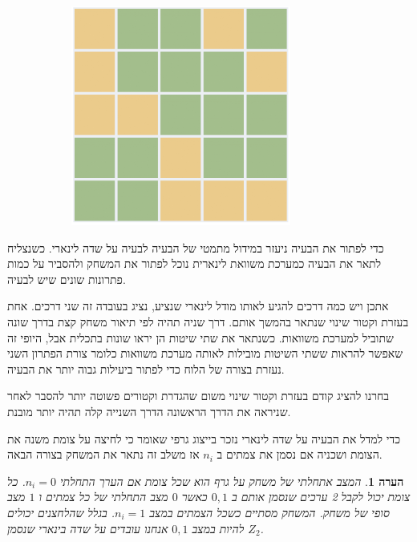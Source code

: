 \documentclass[12pt,leqno]{article}
\newtheorem{comm}{הערה}[section]
\begin{document}
\begin{figure}[ht]
\begin{subfigure}[b]{.25\linewidth}
    \end{subfigure}
    \begin{subfigure}[b]{.25\linewidth}
    \includegraphics[width=\linewidth]{images/5x5_sol.PNG}
    \end{subfigure}
\end{figure}

כדי לפתור את הבעיה ניעזר במידול מתמטי 
של הבעיה 
לבעיה על שדה לינארי.
כשנצליח לתאר את הבעיה כמערכת משוואת לינארית
נוכל לפתור את המשחק ולהסביר על כמות פתרונות שונים
שיש לבעיה.

אתכן ויש כמה דרכים להגיע לאותו מודל לינארי שנציע, נציג בעובדה זה שני דרכים.
אחת בעזרת וקטור שינוי שנתאר בהמשך אותם.
דרך שניה תהיה
לפי תיאור משחק קצת בדרך שונה שתוביל למערכת משוואות.
כשנתאר את שתי שיטות הן יראו שונות בתכלית אבל,
היופי זה שאפשר להראות ששתי השיטות מובילות לאותה מערכת משוואות
כלומר צורת הפתרון השני נעזרת בצורה של הלוח כדי לפתור ביעילות גבוה יותר את הבעיה.

בחרנו להציג קודם בעזרת וקטור שינוי משום שהגדרת וקטורים פשוטה יותר להסבר לאחר שניראה את הדרך הראשונה
הדרך השנייה קלה תהיה יותר מובנת.

כדי למדל את הבעיה על שדה לינארי נזכר בייצוג גרפי שאומר כי לחיצה על צומת משנה את הצומת ושכניה 
אם נסמן את צמתים ב
$n_i$
אז משלב זה נתאר את המשחק בצורה הבאה.
\begin{comm}
    \label{comm: describe the game from here on}
    המצב אתחלתי של משחק על גרף הוא שכל צומת אם הערך התחלתי
    $n_i = 0$.
    כל צומת יכול לקבל 2 ערכים שנסמן אותם ב
    ${0,1}$
    כאשר 
    $0$
    מצב התחלתי של כל צמתים  
    ו
    $1$
    מצב סופי של משחק.
    המשחק מסתיים כשכל הצמתים במצב
    $n_i = 1$.
    בגלל שהלחצנים יכולים להיות במצב 
    $0,1$
    אנחנו עובדים על שדה בינארי
    שנסמן
    $Z_2$.
\end{comm}
\end{document}

